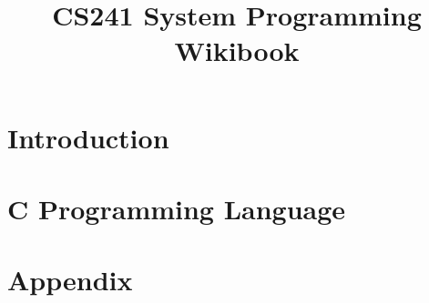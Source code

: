 \documentclass[hidelinks,11pt]{book}
\title{\vspace{-15mm}\fontsize{24pt}{10pt}\selectfont\textbf{CS241 System Programming Wikibook}}
\date{}
\newcommand{\inputchapter}[2]{\chapter{#2}}
\begin{document}
\pagestyle{fancy}
\fancyhf{}
\setcounter{secnumdepth}{1}
\setcounter{tocdepth}{1}

\maketitle

\tableofcontents

\inputchapter{introduction/introduction.tex}{Introduction}
\inputchapter{introc/introc.tex}{C Programming Language}
\inputchapter{appendix/appendix.tex}{Appendix}

\printglossaries
\end{document}
